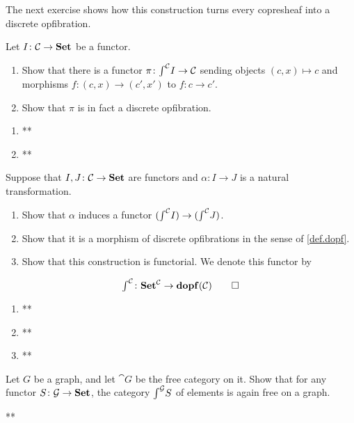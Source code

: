 \documentclass[Book-Poly]{subfiles}
\begin{document}
The next exercise shows how this construction turns every copresheaf into a discrete opfibration.

\begin{exercise}
Let $I\colon\mathcal{C}\to\mathbf{Set}$ be a functor.
\begin{enumerate}
    \item Show that there is a functor $\pi\colon\textstyle{\int}^{\mathcal{C}}I\to\mathcal{C}$ sending objects $(c,x)\mapsto c$ and morphisms $f\colon(c,x)\to(c',x')$ to $f\colon c\to c'$.
    \item Show that $\pi$ is in fact a discrete opfibration.
\end{enumerate}
\begin{solution}
\begin{enumerate}
    \item **
    \item **
\end{enumerate}
\end{solution}
\end{exercise}

\begin{exercise}\label{exc.elts_functor}
Suppose that $I,J\colon\mathcal{C}\to\mathbf{Set}$ are functors and $\alpha\colon I\to J$ is a natural transformation. 
\begin{enumerate}
	\item Show that $\alpha$ induces a functor $(\textstyle{\int}^{\mathcal{C}}I)\to(\textstyle{\int}^{\mathcal{C}}J)$.
	\item Show that it is a morphism of discrete opfibrations in the sense of \cref{def.dopf}.
	\item Show that this construction is functorial. We denote this functor by
\end{enumerate}
	\[
	\textstyle{\int}^{\mathcal{C}}\colon\mathbf{Set}^{\mathcal{C}}\to\mathbf{dopf}(\mathcal{C})
\qedhere	
	\]
\begin{solution}
\begin{enumerate}
    \item **
    \item **
    \item **
\end{enumerate}
\end{solution}
\end{exercise}

\begin{exercise}\label{exc.elts_free_grph}
Let $G$ be a graph, and let $\cat{G}$ be the free category on it. Show that for any functor $S\colon\mathcal{G}\to\mathbf{Set}$, the category $\textstyle{\int}^{\mathcal{G}} S$ of elements is again free on a graph.
\begin{solution}
**
\end{solution}
\end{exercise}
\end{document}
